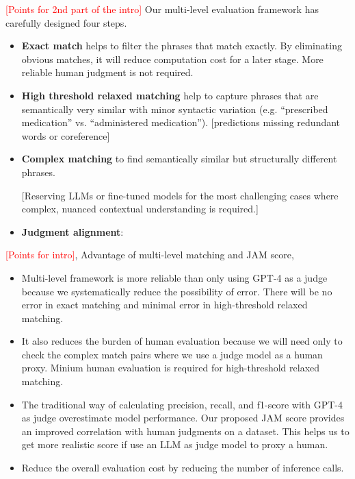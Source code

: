 
\textcolor{red}{[Points for 2nd part of the intro]}
Our multi-level evaluation framework has carefully designed four steps.
\begin{itemize}
    \item \textbf{Exact match} helps to filter the phrases that match exactly. By eliminating obvious matches, it will reduce computation cost for a later stage. More reliable human judgment is not required.
    
    \item \textbf{High threshold relaxed matching} help to capture phrases that are semantically very similar with minor syntactic variation (e.g. “prescribed medication” vs. “administered medication”). [predictions missing redundant words or coreference]

    \item \textbf{Complex matching} to find semantically similar but structurally different phrases.  
    
    [Reserving LLMs or fine-tuned models for the most challenging cases where complex, nuanced contextual understanding is required.]
    \item \textbf{Judgment alignment}:
\end{itemize}



\textcolor{red}{[Points for intro]},
Advantage of multi-level matching and JAM score,
\begin{itemize}
    \item Multi-level framework is more reliable than only using GPT-4 as a judge because we systematically reduce the possibility of error. There will be no error in exact matching and minimal error in high-threshold relaxed matching. 

    \item It also reduces the burden of human evaluation because we will need only to check the complex match pairs where we use a judge model as a human proxy. Minium human evaluation is required for high-threshold relaxed matching. 

     \item The traditional way of calculating precision, recall, and f1-score with GPT-4 as judge overestimate model performance. Our proposed JAM score provides an improved correlation with human judgments on a dataset. This helps us to get more realistic score if use an LLM as judge model to proxy a human. 

    \item Reduce the overall evaluation cost by reducing the number of inference calls. 
\end{itemize}

